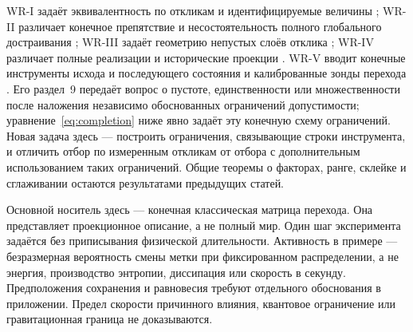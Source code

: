 {WR-I задаёт эквивалентность по откликам и идентифицируемые величины \cite{WRI}; WR-II различает конечное препятствие и несостоятельность полного глобального достраивания \cite{WRII}; WR-III задаёт геометрию непустых слоёв отклика \cite{WRIII}; WR-IV различает полные реализации и исторические проекции \cite{WRIV}. WR-V вводит конечные инструменты исхода и последующего состояния и калиброванные зонды перехода \cite{WRV}. Его раздел~9 передаёт вопрос о пустоте, единственности или множественности после наложения независимо обоснованных ограничений допустимости; уравнение~\eqref{eq:completion} ниже явно задаёт эту конечную схему ограничений. Новая задача здесь --- построить ограничения, связывающие строки инструмента, и отличить отбор по измеренным откликам от отбора с дополнительным использованием таких ограничений. Общие теоремы о факторах, ранге, склейке и сглаживании остаются результатами предыдущих статей.}

{Основной носитель здесь --- конечная классическая матрица перехода. Она представляет проекционное описание, а не полный мир. Один шаг эксперимента задаётся без приписывания физической длительности. Активность в примере --- безразмерная вероятность смены метки при фиксированном распределении, а не энергия, производство энтропии, диссипация или скорость в секунду. Предположения сохранения и равновесия требуют отдельного обоснования в приложении. Предел скорости причинного влияния, квантовое ограничение или гравитационная граница не доказываются.}

